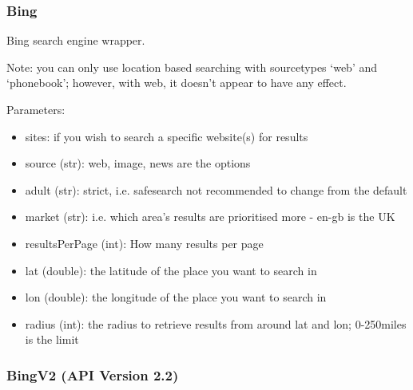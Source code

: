 \documentclass[letterpaper,10pt,english]{sphinxmanual}
\begin{document}
\subsubsection{Bing}
\label{api3.0:bing}\label{api3.0:puppy-bing}

\begin{fulllineitems}
\label{api3.0:puppy.search.engine.Bing}
Bing search engine wrapper.

Note: you can only use location based searching with sourcetypes `web' and `phonebook'; however, with web, it doesn't appear to have any effect.

Parameters:
\begin{itemize}
\item {} 
sites: if you wish to search a specific website(s) for results

\item {} 
source (str): web, image, news are the options

\item {} 
adult (str): strict, i.e. safesearch not recommended to change from the default

\item {} 
market (str): i.e. which area's results are prioritised more - en-gb is the UK

\item {} 
resultsPerPage (int): How many results per page

\item {} 
lat (double): the latitude of the place you want to search in

\item {} 
lon (double): the longitude of the place you want to search in

\item {} 
radius (int): the radius to retrieve results from around lat and lon; 0-250miles is the limit

\end{itemize}

\end{fulllineitems}



\subsubsection{BingV2 (API Version 2.2)}
\label{api3.0:puppy-bingv2}\label{api3.0:bingv2-api-version-2-2}
\end{document}
